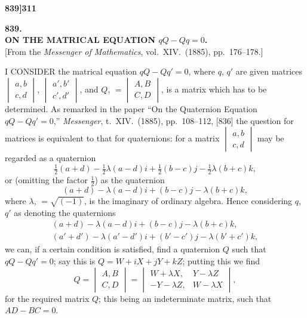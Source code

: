 \documentclass[12pt,a4paper]{article}
\theoremstyle{definition}
\begin{document}
\vspace{2em}


\newpage
\setcounter{page}{311}

\noindent\textbf{839]}\hfill\textbf{311}

\bigskip

\begin{center}
{\Large\textbf{839.}}\\[1em]
{\large\textbf{ON THE MATRICAL EQUATION $qQ - Qq = 0$.}}\\[1em]
[From the \textit{Messenger of Mathematics}, vol.\ XIV.\ (1885), pp.\ 176--178.]
\end{center}

\bigskip

\noindent I CONSIDER the matrical equation $qQ - Qq' = 0$, where $q$, $q'$ are given matrices $\begin{vmatrix} a, b \\ c, d \end{vmatrix}$, $\begin{vmatrix} a', b' \\ c', d' \end{vmatrix}$, and $Q$, $= \begin{vmatrix} A, B \\ C, D \end{vmatrix}$, is a matrix which has to be determined. As remarked in the paper ``On the Quaternion Equation $qQ - Qq' = 0$,'' \textit{Messenger}, t.\ XIV.\ (1885), pp.\ 108--112, [836] the question for matrices is equivalent to that for quaternions: for a matrix $\begin{vmatrix} a, b \\ c, d \end{vmatrix}$ may be regarded as a quaternion
\[
\tfrac{1}{2}(a + d) - \tfrac{1}{2}\lambda(a - d)i + \tfrac{1}{2}(b - c)j - \tfrac{1}{2}\lambda(b + c)k,
\]
or (omitting the factor $\tfrac{1}{2}$) as the quaternion
\[
(a + d) - \lambda(a - d)i + (b - c)j - \lambda(b + c)k,
\]
where $\lambda$, $= \sqrt{(-1)}$, is the imaginary of ordinary algebra. Hence considering $q$, $q'$ as denoting the quaternions
\begin{align*}
(a + d) - \lambda(a - d)i + (b - c)j - \lambda(b + c)k, \\
(a' + d') - \lambda(a' - d')i + (b' - c')j - \lambda(b' + c')k,
\end{align*}
we can, if a certain condition is satisfied, find a quaternion $Q$ such that $qQ - Qq' = 0$; say this is $Q = W + iX + jY + kZ$; putting this we find
\[
Q = \begin{vmatrix} A, B \\ C, D \end{vmatrix} = \begin{vmatrix} W + \lambda X, & Y - \lambda Z \\ -Y - \lambda Z, & W - \lambda X \end{vmatrix},
\]
for the required matrix $Q$; this being an indeterminate matrix, such that $AD - BC = 0$.
\end{document}
